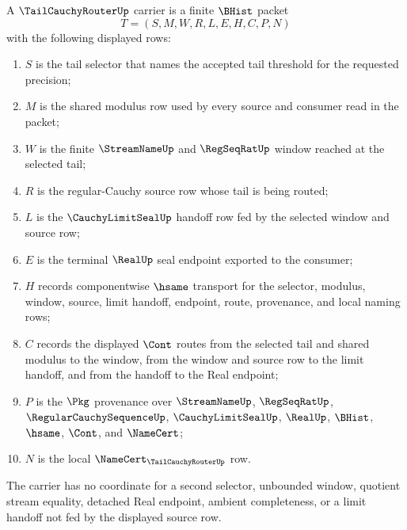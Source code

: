 \begin{definition}
\label{def:tailcauchyrouter-carrier}
A $\TailCauchyRouterUp$ carrier is a finite $\BHist$ packet
$$
T=(S,M,W,R,L,E,H,C,P,N)
$$
with the following displayed rows:
\begin{enumerate}
\item $S$ is the tail selector that names the accepted tail threshold for the requested precision;
\item $M$ is the shared modulus row used by every source and consumer read in the packet;
\item $W$ is the finite $\StreamNameUp$ and $\RegSeqRatUp$ window reached at the selected tail;
\item $R$ is the regular-Cauchy source row whose tail is being routed;
\item $L$ is the $\CauchyLimitSealUp$ handoff row fed by the selected window and source row;
\item $E$ is the terminal $\RealUp$ seal endpoint exported to the consumer;
\item $H$ records componentwise $\hsame$ transport for the selector, modulus, window, source, limit handoff, endpoint, route, provenance, and local naming rows;
\item $C$ records the displayed $\Cont$ routes from the selected tail and shared modulus to the window, from the window and source row to the limit handoff, and from the handoff to the Real endpoint;
\item $P$ is the $\Pkg$ provenance over $\StreamNameUp$, $\RegSeqRatUp$, $\RegularCauchySequenceUp$, $\CauchyLimitSealUp$, $\RealUp$, $\BHist$, $\hsame$, $\Cont$, and $\NameCert$;
\item $N$ is the local $\NameCert_{\TailCauchyRouterUp}$ row.
\end{enumerate}
The carrier has no coordinate for a second selector, unbounded window, quotient stream equality, detached Real endpoint, ambient completeness, or a limit handoff not fed by the displayed source row.
\end{definition}

